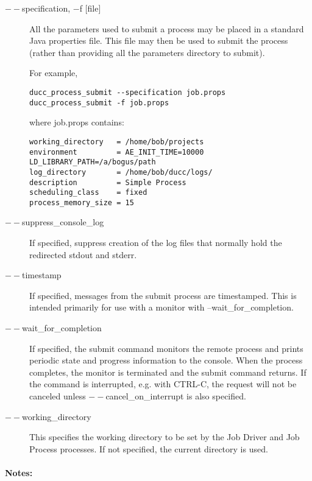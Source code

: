 \begin{description}
        \item[$--$specification, $-$f {[file]} ] All the parameters used to submit a process may be placed
          in a standard Java properties file.  This file may then be used to submit the process
          (rather than providing all the parameters directory to submit).
          
          For example, 
\begin{verbatim}
ducc_process_submit --specification job.props 
ducc_process_submit -f job.props 
\end{verbatim}

          where job.props contains: 
\begin{verbatim}
working_directory   = /home/bob/projects
environment         = AE_INIT_TIME=10000 LD_LIBRARY_PATH=/a/bogus/path 
log_directory       = /home/bob/ducc/logs/ 
description         = Simple Process
scheduling_class    = fixed 
process_memory_size = 15 
\end{verbatim}

        \item[$--$suppress\_console\_log] If specified, suppress creation of the log files that 
          normally hold the redirected stdout and stderr.

        \item[$--$timestamp ]
          If specified, messages from the submit process are timestamped. This is intended primarily 
          for use with a monitor with --wait\_for\_completion. 

        \item[$--$wait\_for\_completion ]             
          If specified, the submit command monitors the remote process and prints periodic
          state and progress information to the console.  When the process completes, the monitor
          is terminated and the submit command returns.  If the command is interrupted, e.g. with CTRL-C,
          the request will not be canceled unless $--$cancel\_on\_interrupt is also specified.

        \item[$--$working\_directory ] This specifies the working directory to be set by the Job
          Driver and Job Process processes.  If not specified, the current directory is used.

     \end{description}
        
    \paragraph{Notes:}

